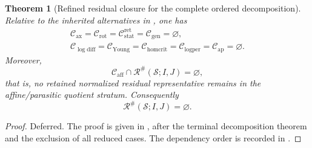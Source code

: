 \documentclass[11pt]{amsart}
\numberwithin{equation}{section}
\theoremstyle{plain}
\newtheorem{theorem}{Theorem}[section]
\theoremstyle{definition}
\theoremstyle{remark}
\newcommand{\calS}{\mathcal S}
\newcommand{\calR}{\mathcal R}
\newcommand{\Cax}{\mathcal C_{\mathrm{ax}}}
\newcommand{\Crot}{\mathcal C_{\mathrm{rot}}}
\newcommand{\Cstat}{\mathcal C_{\mathrm{stat}}^{\mathrm{ret}}}
\newcommand{\Caff}{\mathcal C_{\mathrm{aff}}}
\newcommand{\Cgen}{\mathcal C_{\mathrm{gen}}}
\newcommand{\Chomcrit}{\mathcal C_{\mathrm{homcrit}}}
\newcommand{\Clogper}{\mathcal C_{\mathrm{logper}}}
\newcommand{\Capcrit}{\mathcal C_{\mathrm{ap}}}
\newcommand{\Cyoung}{\mathcal C_{\mathrm{Young}}}
\newcommand{\Clogdiff}{\mathcal C_{\log\mathrm{diff}}}
\begin{document}
\begin{theorem}[Refined residual closure for the complete ordered decomposition]
\label{thm:refined-residual-closure}
Relative to the inherited alternatives in
, one has
\[
\begin{gathered}
   \Cax=\Crot=\Cstat=\Cgen=\varnothing,\\
   \Clogdiff=\Cyoung=\Chomcrit=\Clogper=\Capcrit=\varnothing .
\end{gathered}
\]
Moreover,
\[
   \Caff\cap\calR^\#(\calS;I,J)=\varnothing ,
\]
that is, no retained normalized residual representative remains in the
affine/parasitic quotient stratum.  Consequently
\[
   \calR^\#(\calS;I,J)=\varnothing .
\]
\end{theorem}

\begin{proof}
\textup{Deferred.}  The proof is given in
, after the terminal decomposition theorem and the
exclusion of all reduced cases.  The dependency order is recorded in
.
\end{proof}
\end{document}
